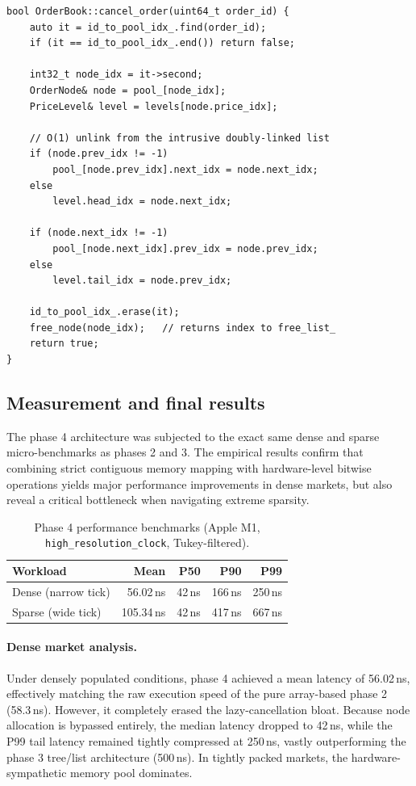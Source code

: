 \documentclass[11pt,a4paper]{article}
\begin{document}
\begin{lstlisting}[caption={O(1) memory pool cancellation (phase 4)}]
bool OrderBook::cancel_order(uint64_t order_id) {
    auto it = id_to_pool_idx_.find(order_id);
    if (it == id_to_pool_idx_.end()) return false;

    int32_t node_idx = it->second;
    OrderNode& node = pool_[node_idx];
    PriceLevel& level = levels[node.price_idx];

    // O(1) unlink from the intrusive doubly-linked list
    if (node.prev_idx != -1)
        pool_[node.prev_idx].next_idx = node.next_idx;
    else
        level.head_idx = node.next_idx;

    if (node.next_idx != -1)
        pool_[node.next_idx].prev_idx = node.prev_idx;
    else
        level.tail_idx = node.prev_idx;

    id_to_pool_idx_.erase(it);
    free_node(node_idx);   // returns index to free_list_
    return true;
}
\end{lstlisting}

\subsection{Measurement and final results}

The phase 4 architecture was subjected to the exact same dense and sparse
micro-benchmarks as phases 2 and 3. The empirical results confirm that
combining strict contiguous memory mapping with hardware-level bitwise
operations yields major performance improvements in dense markets, but also
reveal a critical bottleneck when navigating extreme sparsity.

\begin{table}[h]
\centering
\begin{tabular}{lrrrr}
\toprule
Workload & Mean & P50 & P90 & P99 \\
\midrule
Dense (narrow tick)  & 56.02\,ns  & 42\,ns & 166\,ns & 250\,ns \\
Sparse (wide tick)   & 105.34\,ns & 42\,ns & 417\,ns & 667\,ns \\
\bottomrule
\end{tabular}
\caption{Phase 4 performance benchmarks (Apple M1,
\texttt{high\_resolution\_clock}, Tukey-filtered).}
\label{tab:phase4}
\end{table}

\paragraph{Dense market analysis.} Under densely populated conditions,
phase 4 achieved a mean latency of 56.02\,ns, effectively matching the raw
execution speed of the pure array-based phase 2 (58.3\,ns). However, it
completely erased the lazy-cancellation bloat. Because node allocation is
bypassed entirely, the median latency dropped to 42\,ns, while the P99 tail
latency remained tightly compressed at 250\,ns, vastly outperforming the
phase 3 tree/list architecture (500\,ns). In tightly packed markets, the
hardware-sympathetic memory pool dominates.
\end{document}
